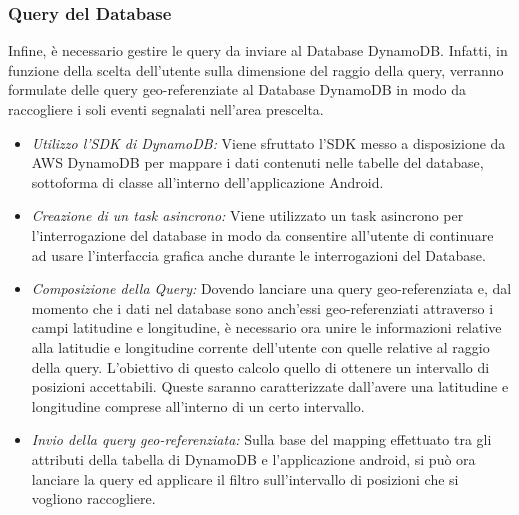 \subsubsection{Query del Database}
Infine, è necessario gestire le query da inviare al Database DynamoDB. Infatti, in funzione della scelta dell'utente sulla dimensione del raggio della query, verranno formulate delle query geo-referenziate al Database DynamoDB in modo da raccogliere i soli eventi segnalati nell'area prescelta.
\begin{itemize}
	\item \textit{Utilizzo l'SDK di DynamoDB:  }Viene sfruttato l'SDK messo a disposizione da AWS DynamoDB per mappare i dati contenuti nelle tabelle del database, sottoforma di classe all'interno dell'applicazione Android.
	
	
	\item \textit{Creazione di un task asincrono:} Viene utilizzato un task asincrono per l'interrogazione del database in modo da consentire all'utente di continuare ad usare l'interfaccia grafica anche durante le interrogazioni del Database.
	
	
	\item \textit{Composizione della Query:} Dovendo lanciare una query geo-referenziata e, dal momento che i dati nel database sono anch'essi geo-referenziati attraverso i campi latitudine e longitudine, è necessario ora unire le informazioni relative alla latitudie e longitudine corrente dell'utente con quelle relative al raggio della query. L'obiettivo di questo calcolo  quello di ottenere un intervallo di posizioni accettabili. Queste saranno caratterizzate dall'avere una latitudine e longitudine comprese all'interno di un certo intervallo.
	
	
	\item \textit{Invio della query geo-referenziata:} Sulla base del mapping effettuato tra gli attributi della tabella di DynamoDB e l'applicazione android, si può ora lanciare la query ed applicare il filtro sull'intervallo di posizioni che si vogliono raccogliere.
	
\end{itemize}

